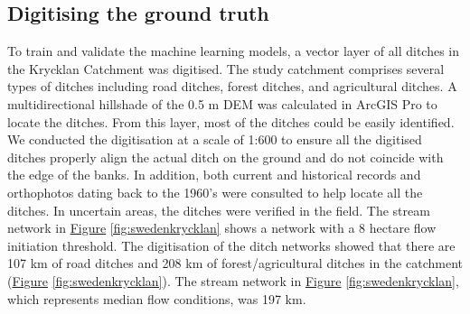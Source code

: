 \documentclass[11pt, review]{elsarticle} %
\begin{document}
\subsection{Digitising the ground truth}
To train and validate the machine learning models, a vector layer of all ditches in the Krycklan Catchment \citep{krycklancatchment} was digitised. The study catchment comprises several types of ditches including road ditches, forest ditches, and agricultural ditches. A multidirectional hillshade of the 0.5 m DEM was calculated in ArcGIS Pro to locate the ditches. From this layer, most of the ditches could be easily identified. We conducted the digitisation at a scale of 1:600 to ensure all the digitised ditches properly align the actual ditch on the ground and do not coincide with the edge of the banks. In addition, both current and historical records and orthophotos dating back to the 1960's were consulted to help locate all the ditches. In uncertain areas, the ditches were verified in the field. The stream network in \hyperref[fig:swedenkrycklan]{Figure} \ref{fig:swedenkrycklan} shows a network with a 8 hectare flow initiation threshold. The digitisation of the ditch networks showed that there are 107 km of road ditches and 208 km of forest/agricultural ditches in the catchment (\hyperref[fig:swedenkrycklan]{Figure} \ref{fig:swedenkrycklan}). The stream network in \hyperref[fig:swedenkrycklan]{Figure} \ref{fig:swedenkrycklan}, which represents median flow conditions, was 197 km.
\end{document}
